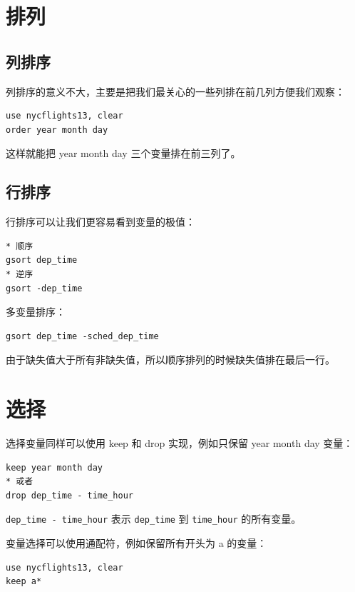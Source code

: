 \section{排列}
\subsection{列排序}

列排序的意义不大，主要是把我们最关心的一些列排在前几列方便我们观察：

\begin{lstlisting}
use nycflights13, clear
order year month day
\end{lstlisting}

这样就能把 year month day 三个变量排在前三列了。

\subsection{行排序}

行排序可以让我们更容易看到变量的极值：

\begin{lstlisting}
* 顺序
gsort dep_time
* 逆序
gsort -dep_time
\end{lstlisting}

多变量排序：

\begin{lstlisting}
gsort dep_time -sched_dep_time
\end{lstlisting}

由于缺失值大于所有非缺失值，所以顺序排列的时候缺失值排在最后一行。

\section{选择}

选择变量同样可以使用 keep 和 drop 实现，例如只保留 year month day 变量：

\begin{lstlisting}
keep year month day
* 或者
drop dep_time - time_hour
\end{lstlisting}

\texttt{dep\_time\ -\ time\_hour} 表示 \texttt{dep\_time} 到 \texttt{time\_hour} 的所有变量。

变量选择可以使用通配符，例如保留所有开头为 a 的变量：

\begin{lstlisting}
use nycflights13, clear
keep a*
\end{lstlisting}

